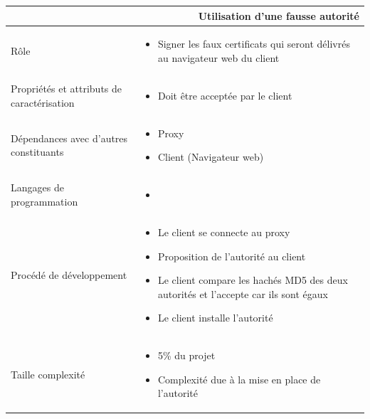 \documentclass[a4paper,11pt,french]{article}
\begin{document}
\begin{center}
        \vspace*{0.7cm}
        \begin{tabularx}{16cm}{|l|X|}
        \hline
        \multicolumn{2}{|r|}{\textbf{Utilisation d'une fausse autorité}}\\
        \hline
        R\^ole &  \begin{itemize}\item Signer les faux certificats qui seront délivrés au navigateur web du client\end{itemize}\\
        \hline
        Propriétés et attributs de caractérisation & \begin{itemize} \item Doit \^etre acceptée par le client \end{itemize}\\
        \hline
        Dépendances avec d'autres constituants & \begin{itemize}\item Proxy \item Client (Navigateur web) \end{itemize}\\
        \hline
        Langages de programmation & \begin{itemize} \item  \end{itemize}\\
        \hline
        Procédé de développement & \begin{itemize}\item Le client se connecte au proxy \item Proposition de l’autorité au client \item Le client compare les hachés MD5 des deux autorités et l’accepte car ils sont égaux \item Le client installe l’autorité
\end{itemize}\\
        \hline
        Taille complexité & \begin{itemize}\item 5\% du projet \item Complexité due à la mise en place de l'autorité\end{itemize}\\
        \hline
        \end{tabularx}
\end{center}
\end{document}
